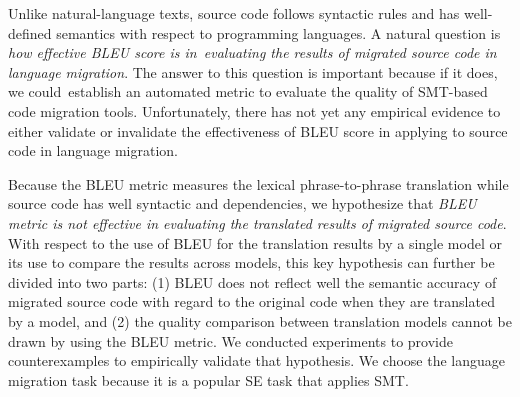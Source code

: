 Unlike natural-language texts, source code follows syntactic rules and
has well-defined semantics with respect to programming languages. A
natural question is {\em how effective BLEU score is in~evaluating the
  results of migrated source code in language migration}. The answer
to this question is important because if it does, we could~establish
an automated metric to evaluate the quality of SMT-based code
migration tools.
Unfortunately, there has not yet
any empirical evidence to either validate or invalidate the
effectiveness of BLEU score in applying to source code in language
migration.

Because the BLEU metric measures the lexical phrase-to-phrase translation
while source code has well syntactic and dependencies, we hypothesize that
{\em BLEU metric is not effective in evaluating the translated results of
migrated source code}. With respect to the use of BLEU
for the translation results by a single model or its use to compare
the results across models, this key hypothesis can further be divided
into two parts: (1) BLEU does not reflect well the semantic accuracy
of migrated source code with regard to the original code when they are
translated by a model, and (2) the quality comparison between translation 
models cannot be drawn by using the BLEU metric.
%
We conducted experiments to provide counterexamples to empirically
validate that hypothesis. We choose the language migration task
because it is a popular SE task that applies SMT.

